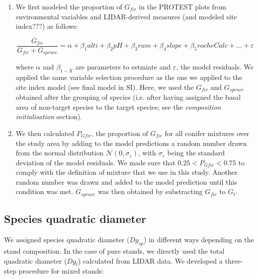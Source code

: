 \documentclass[a4paper]{article}
\begin{document}
\begin{enumerate}

  \item We first modeled the proportion of $G_{fir}$ in the PROTEST plots from environmental variables and LIDAR-derived measures (and modeled site index???) as follows:

  \begin{equation}\label{gfir-spruce}
    \frac{G_{fir}}{G_{fir} + G_{spruce}} = \alpha + \beta_1 alti + \beta_2 pH +\beta_3 rum +\beta_4 slope +\beta_5 rocheCalc+...+ \varepsilon
  \end{equation}

  \noindent where $\alpha$ and $\beta_{1-X}$ are parameters to estmiate and $\varepsilon$, the model residuals. We applied the same variable selection procedure as the one we applied to the site index model (see final model in SI). Here, we used the $G_{fir}$ and $G_{spruce}$ obtained after the grouping of species (i.e. after having assigned the basal area of non-target species to the target species; see the \textit{composition initialisation} section).

  \item We then calculated $P_{Gfir}$, the proportion of $G_{fir}$ for all conifer mixtures over the study area by adding to the model predictions a random number drawn from the normal distribution $\mathcal{N} (0, \sigma_\varepsilon)$, with $\sigma_\varepsilon$ being the standard deviation of the model residuals. We made sure that $0.25 < P_{Gfir} < 0.75$ to comply with the definition of mixture that we use in this study. Another random number was drawn and added to the model prediction until this condition was met. $G_{spruce}$ was then obtained by substracting $G_{fir}$ to $G_t$.

\end{enumerate}


\subsection*{Species quadratic diameter}\label{Dg}

We assigned species quadratic diameter ($Dg_{sp}$) in different ways depending on the stand composition. In the case of pure stands, we directly used the total quadratic diameter ($Dg_t$) calculated from LIDAR data. We developed a three-step procedure for mixed stands:
\end{document}
